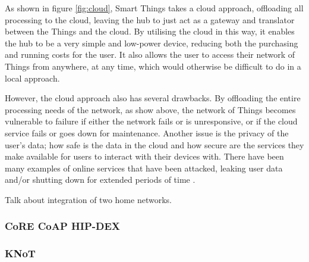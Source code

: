As shown in figure \ref{fig:cloud}, Smart Things takes a cloud approach, offloading all processing to the cloud, leaving the hub to just act as a gateway and translator between the Things and the cloud. By utilising the cloud in this way, it enables the hub to be a very simple and low-power device, reducing both the purchasing and running costs for the user. It also allows the user to access their network of Things from anywhere, at any time, which would otherwise be difficult to do in a local approach. 

However, the cloud approach also has several drawbacks. By offloading the entire processing needs of the network, as show above, the network of Things becomes vulnerable to failure if either the network fails or is unresponsive, or if the cloud service fails or goes down for maintenance. Another issue is the privacy of the user's data; how safe is the data in the cloud and how secure are the services they make available for users to interact with their devices with. There have been many examples of online services that have been attacked, leaking user data and/or shutting down for extended periods of time \cite{Playstation, Amazon, Google}.

Talk about integration of two home networks.



\subsubsection{CoRE CoAP HIP-DEX} %
\label{ssub:core_coap}

\subsubsection{KNoT} %
\label{ssub:knot}


